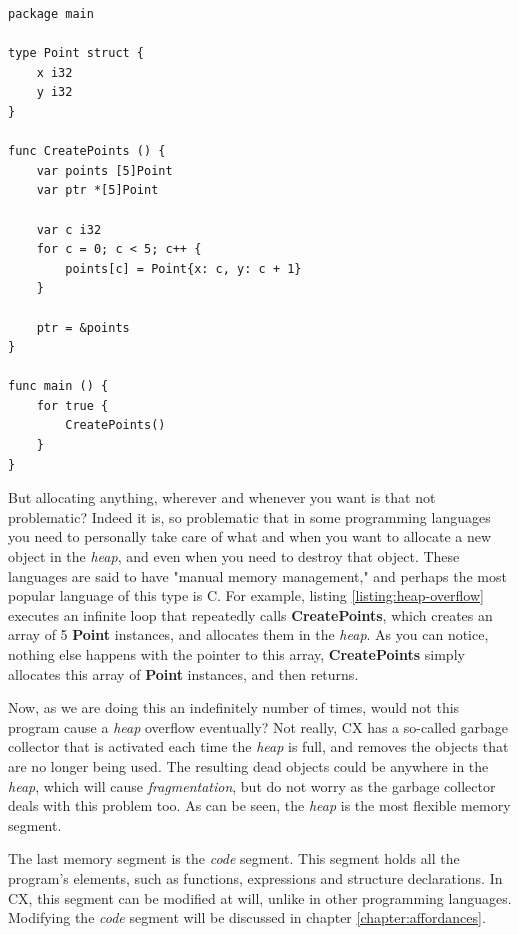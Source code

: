 \documentclass[11pt,fleqn,openany]{book} %
\begin{document}
\begin{lstlisting}[caption={Heap overflow},captionpos=b,label={listing:heap-overflow}]
package main

type Point struct {
	x i32
	y i32
}

func CreatePoints () {
	var points [5]Point
	var ptr *[5]Point
	
	var c i32
	for c = 0; c < 5; c++ {
		points[c] = Point{x: c, y: c + 1}
	}

	ptr = &points
}

func main () {
	for true {
		CreatePoints()
	}
}
\end{lstlisting}

But allocating anything, wherever and whenever you want is that not problematic? Indeed it is, so problematic that in some programming languages you need to personally take care of what and when you want to allocate a new object in the \emph{heap}, and even when you need to destroy that object. These languages are said to have "manual memory management," and perhaps the most popular language of this type is C. For example, listing \ref{listing:heap-overflow} executes an infinite loop that repeatedly calls \textbf{CreatePoints}, which creates an array of 5 \textbf{Point} instances, and allocates them in the \emph{heap}. As you can notice, nothing else happens with the pointer to this array, \textbf{CreatePoints} simply allocates this array of \textbf{Point} instances, and then returns.

Now, as we are doing this an indefinitely number of times, would not this program cause a \emph{heap} overflow eventually? Not really, CX has a so-called garbage collector that is activated each time the \emph{heap} is full, and removes the objects that are no longer being used. The resulting dead objects could be anywhere in the \emph{heap}, which will cause \emph{fragmentation}, but do not worry as the garbage collector deals with this problem too. As can be seen, the \emph{heap} is the most flexible memory segment.

The last memory segment is the \emph{code} segment. This segment holds all the program's elements, such as functions, expressions and structure declarations. In CX, this segment can be modified at will, unlike in other programming languages. Modifying the \emph{code} segment will be discussed in chapter \ref{chapter:affordances}.%

\end{document}
